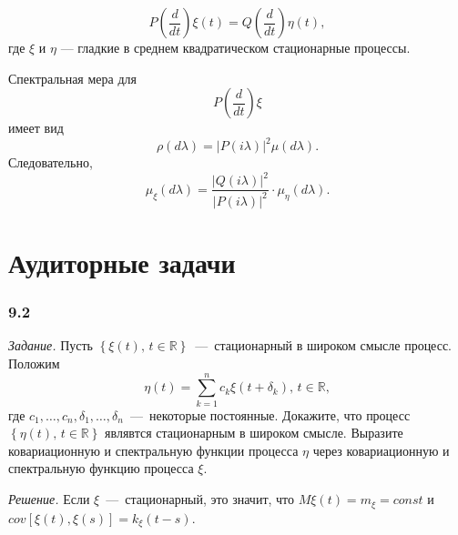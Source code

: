 \begin{equation*}
  P \left( \frac{d}{dt} \right) \xi \left( t \right) =
  Q \left( \frac{d}{dt} \right) \eta \left( t \right),
\end{equation*}
где $ \xi $ и $ \eta $ --- гладкие в среднем квадратическом стационарные процессы.

Спектральная мера для
\begin{equation*}
  P \left( \frac{d}{dt} \right) \xi
\end{equation*}
имеет вид
\begin{equation*}
  \rho \left( d \lambda \right) =
  \left| P \left( i \lambda \right) \right|^2 \mu \left( d \lambda \right).
\end{equation*}
Следовательно,
\begin{equation*}
  \mu_{ \xi } \left( d \lambda \right) =
  \frac{ \left| Q \left( i \lambda \right) \right|^2}{ \left| P \left( i \lambda \right) \right|^2} \cdot
  \mu_{ \eta } \left( d \lambda \right).
\end{equation*}

\section*{Аудиторные задачи}

\subsubsection*{9.2}

\textit{Задание.}
Пусть $ \left\{ \xi \left( t \right), \, t \in \mathbb{R} \right\} $~---~стационарный
в широком смысле процесс.
Положим
\begin{equation*}
  \eta \left( t \right) =
  \sum \limits_{k = 1}^n c_k \xi \left( t + \delta_k \right), \,
  t \in \mathbb{R},
\end{equation*}
где $c_1, \dotsc, c_n, \delta_1, \dotsc, \delta_n$~---~некоторые постоянные.
Докажите, что процесс $ \left\{ \eta \left( t \right), \, t \in \mathbb{R} \right\} $
являвтся стационарным в широком смысле.
Выразите ковариационную и спектральную функции процесса $ \eta $
через ковариационную и спектральную функцию процесса $ \xi $.

\textit{Решение.}
Если $ \xi $~---~стационарный, это значит, что $M \xi \left( t \right) = m_{ \xi } = const$ и
$cov \left[ \xi \left( t \right), \xi \left( s \right) \right] =
  k_{ \xi } \left( t - s \right) $.

